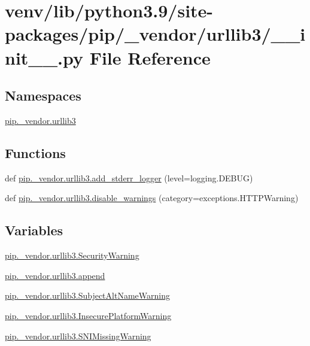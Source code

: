 \hypertarget{venv_2lib_2python3_89_2site-packages_2pip_2__vendor_2urllib3_2____init_____8py}{}\section{venv/lib/python3.9/site-\/packages/pip/\+\_\+vendor/urllib3/\+\_\+\+\_\+init\+\_\+\+\_\+.py File Reference}
\label{venv_2lib_2python3_89_2site-packages_2pip_2__vendor_2urllib3_2____init_____8py}
\subsection*{Namespaces}
\begin{DoxyCompactItemize}
\item 
 \hyperlink{namespacepip_1_1__vendor_1_1urllib3}{pip.\+\_\+vendor.\+urllib3}
\end{DoxyCompactItemize}
\subsection*{Functions}
\begin{DoxyCompactItemize}
\item 
def \hyperlink{namespacepip_1_1__vendor_1_1urllib3_a7fab237b204028b828a2bf9e72d152fa}{pip.\+\_\+vendor.\+urllib3.\+add\+\_\+stderr\+\_\+logger} (level=logging.\+D\+E\+B\+UG)
\item 
def \hyperlink{namespacepip_1_1__vendor_1_1urllib3_ab99d0d079c455e80beb203e0e048d2d6}{pip.\+\_\+vendor.\+urllib3.\+disable\+\_\+warnings} (category=exceptions.\+H\+T\+T\+P\+Warning)
\end{DoxyCompactItemize}
\subsection*{Variables}
\begin{DoxyCompactItemize}
\item 
\hyperlink{namespacepip_1_1__vendor_1_1urllib3_a48f87efbca150b1cca817181d5954a37}{pip.\+\_\+vendor.\+urllib3.\+Security\+Warning}
\item 
\hyperlink{namespacepip_1_1__vendor_1_1urllib3_a5c32d37e18b1f522a92aaa81838ba754}{pip.\+\_\+vendor.\+urllib3.\+append}
\item 
\hyperlink{namespacepip_1_1__vendor_1_1urllib3_aa87e8e52b483d070b9390e5a488681ee}{pip.\+\_\+vendor.\+urllib3.\+Subject\+Alt\+Name\+Warning}
\item 
\hyperlink{namespacepip_1_1__vendor_1_1urllib3_a6c0655b62a0bc5f7b1044480f43c4043}{pip.\+\_\+vendor.\+urllib3.\+Insecure\+Platform\+Warning}
\item 
\hyperlink{namespacepip_1_1__vendor_1_1urllib3_abefe6ffba3e0d4428962daa8dbc58535}{pip.\+\_\+vendor.\+urllib3.\+S\+N\+I\+Missing\+Warning}
\end{DoxyCompactItemize}

